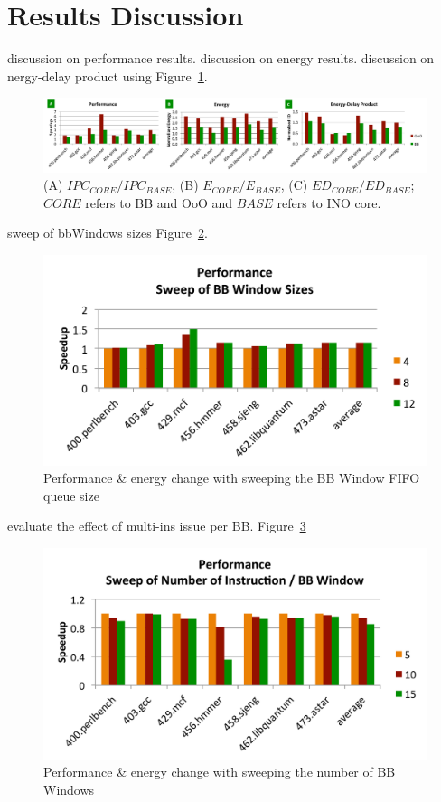 \section{Results Discussion}
\label{sec:discussion}


discussion on performance results.  discussion on energy results.  discussion on
nergy-delay product using Figure~\ref{fig:overall}.
\begin{figure}[h]
	\centering
	\includegraphics[width=\textwidth]{result/overall_perf.pdf} 
    \caption{(A) $IPC_{CORE}/IPC_{BASE}$, (B) $E_{CORE}/E_{BASE}$, (C)
        $ED_{CORE}/ED_{BASE}$; $CORE$ refers to BB and OoO and $BASE$ refers to
            INO core.}
	\label{fig:overall}
\end{figure}

sweep of bbWindows sizes Figure~\ref{fig:bbWin_size}.
\begin{figure}[h]
	\centering
	\includegraphics[width=1.0\columnwidth]{result/bbWin_size.pdf} 
    \caption{Performance \& energy change with sweeping the BB Window FIFO queue size}
	\label{fig:bbWin_size}
\end{figure}

evaluate the effect of multi-ins issue per BB. Figure~\ref{fig:bbWin_ins_cnt}
\begin{figure}[h]
	\centering
	\includegraphics[width=1.0\columnwidth]{result/bbWin_ins_cnt.pdf} 
    \caption{Performance \& energy change with sweeping the number of BB Windows}
	\label{fig:bbWin_ins_cnt}
\end{figure}

